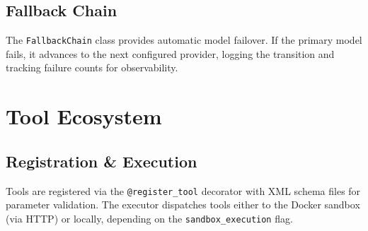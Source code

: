 \documentclass[12pt,a4paper]{report}
\begin{document}
\section{Fallback Chain}
The \texttt{FallbackChain} class provides automatic model failover. If the primary
model fails, it advances to the next configured provider, logging the transition
and tracking failure counts for observability.


\chapter{Tool Ecosystem}
\label{ch:tools}

\section{Registration \& Execution}
Tools are registered via the \texttt{@register\_tool} decorator with XML schema
files for parameter validation. The executor dispatches tools either to the
Docker sandbox (via HTTP) or locally, depending on the \texttt{sandbox\_execution}
flag.
\end{document}
